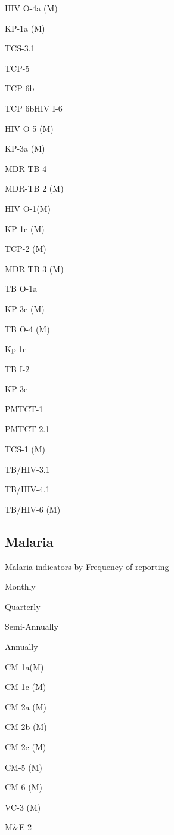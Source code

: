 \documentclass[]{book}
\begin{document}
HIV O-4a (M)

KP-1a (M)

TCS-3.1

TCP-5

TCP 6b

TCP 6bHIV I-6

HIV O-5 (M)

KP-3a (M)

MDR-TB 4

MDR-TB 2 (M)

HIV O-1(M)

KP-1c (M)

TCP-2 (M)

MDR-TB 3 (M)

TB O-1a

KP-3c (M)

TB O-4 (M)

Kp-1e

TB I-2

KP-3e

PMTCT-1

PMTCT-2.1

TCS-1 (M)

TB/HIV-3.1

TB/HIV-4.1

TB/HIV-6 (M)

\hypertarget{malaria}{%
\subsection{Malaria}\label{malaria}}

\label{tab:unnamed-chunk-5}Malaria indicators by Frequency of reporting

Monthly

Quarterly

Semi-Annually

Annually

CM-1a(M)

CM-1c (M)

CM-2a (M)

CM-2b (M)

CM-2c (M)

CM-5 (M)

CM-6 (M)

VC-3 (M)

M\&E-2


\end{document}
